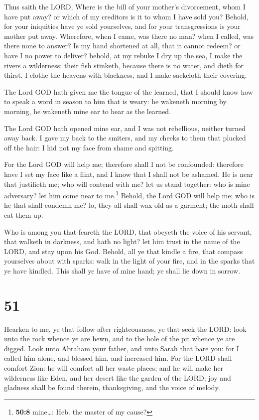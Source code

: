  Thus saith the LORD, Where is the bill of your mother's
divorcement, whom I have put away? or which of my creditors is it to
whom I have sold you? Behold, for your iniquities have ye sold
yourselves, and for your transgressions is your mother put away.
 Wherefore, when I came, was there no man? when I called,
was there none to answer? Is my hand shortened at all, that it cannot
redeem? or have I no power to deliver? behold, at my rebuke I dry up the
sea, I make the rivers a wilderness: their fish stinketh, because there
is no water, and dieth for thirst.  I clothe the heavens
with blackness, and I make sackcloth their covering.

 The Lord GOD hath given me the tongue of the learned,
that I should know how to speak a word in season to him that is weary:
he wakeneth morning by morning, he wakeneth mine ear to hear as the
learned.

 The Lord GOD hath opened mine ear, and I was not
rebellious, neither turned away back.  I gave my back to
the smiters, and my cheeks to them that plucked off the hair: I hid not
my face from shame and spitting.

 For the Lord GOD will help me; therefore shall I not be
confounded: therefore have I set my face like a flint, and I know that I
shall not be ashamed.  He is near that justifieth me; who
will contend with me? let us stand together: who is mine adversary? let
him come near to me.\footnote{\textbf{50:8} mine\ldots: Heb. the master
  of my cause?}  Behold, the Lord GOD will help me; who is
he that shall condemn me? lo, they all shall wax old as a garment; the
moth shall eat them up.

 Who is among you that feareth the LORD, that obeyeth the
voice of his servant, that walketh in darkness, and hath no light? let
him trust in the name of the LORD, and stay upon his God.
 Behold, all ye that kindle a fire, that compass
yourselves about with sparks: walk in the light of your fire, and in the
sparks that ye have kindled. This shall ye have of mine hand; ye shall
lie down in sorrow.

\hypertarget{section-50}{%
\section{51}\label{section-50}}

 Hearken to me, ye that follow after righteousness, ye
that seek the LORD: look unto the rock whence ye are hewn, and to the
hole of the pit whence ye are digged.  Look unto Abraham
your father, and unto Sarah that bare you: for I called him alone, and
blessed him, and increased him.  For the LORD shall
comfort Zion: he will comfort all her waste places; and he will make her
wilderness like Eden, and her desert like the garden of the LORD; joy
and gladness shall be found therein, thanksgiving, and the voice of
melody.


